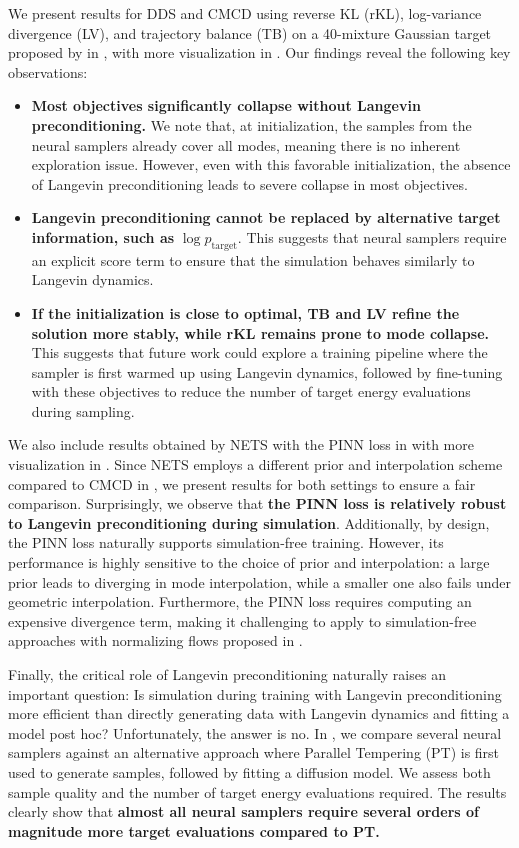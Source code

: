 We present results for DDS and CMCD using reverse KL (rKL), log-variance divergence (LV), and trajectory balance (TB) on a 40-mixture Gaussian target proposed by \citet{midgleyflow} in , with more visualization in .
Our findings reveal the following key observations:
\begin{itemize}[leftmargin=*]
    \item \textbf{Most objectives significantly collapse without Langevin preconditioning.}
We note that, at initialization, the samples from the neural samplers already cover all modes, meaning there is no inherent exploration issue. 
However, even with this favorable initialization, the absence of Langevin preconditioning leads to severe collapse in most objectives.
\item \textbf{Langevin preconditioning cannot be replaced by alternative target information, such as} $\log p_\text{target}$.
This suggests that neural samplers require an explicit score term to ensure that the simulation behaves similarly to Langevin dynamics.
\item \textbf{If the initialization is close to optimal, TB and LV refine the solution more stably, while rKL remains prone to mode collapse.}
This suggests that future work could explore a training pipeline where the sampler is first warmed up using Langevin dynamics, followed by fine-tuning with these objectives to reduce the number of target energy evaluations during sampling.
\end{itemize}
We also include results obtained by NETS with the PINN loss in   with more visualization in .
Since NETS employs a different prior and interpolation scheme compared to CMCD in , we present results for both settings to ensure a fair comparison.
Surprisingly, we observe that \textbf{the PINN loss is relatively robust to Langevin preconditioning during simulation}.
Additionally, by design, the PINN loss naturally supports simulation-free training.
However, its performance is highly sensitive to the choice of prior and interpolation:
a large prior leads to diverging in mode interpolation, while a smaller one also fails under geometric interpolation.
Furthermore, the PINN loss requires computing an expensive divergence term, making it challenging to apply to simulation-free approaches with normalizing flows proposed in .


Finally, the critical role of Langevin preconditioning naturally raises an important question:
Is simulation during training with Langevin preconditioning more efficient than directly generating data with Langevin dynamics and fitting a model post hoc?
Unfortunately, the answer is no.
In , we compare several neural samplers against an alternative approach where Parallel Tempering (PT) \citep[PT, ][]{PhysRevLett.57.2607,earl2005parallel} is first used to generate samples, followed by fitting a diffusion model. 
We assess both sample quality and the number of target energy evaluations required.
The results clearly show that \textbf{almost all neural samplers require several orders of magnitude more target evaluations compared to PT.}
